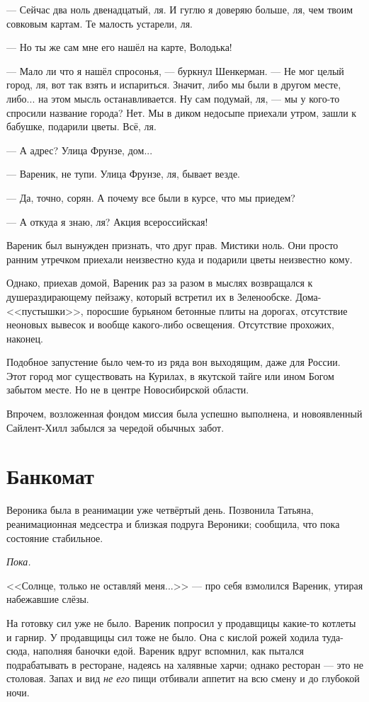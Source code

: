 \documentclass[a4paper,10pt,fleqn]{book}\usepackage{polyglossia}\setdefaultlanguage{english}\setotherlanguage{russian}\defaultfontfeatures{Ligatures=TeX,Mapping=tex-text} \usepackage{xcolor}\definecolor{lightgray}{HTML}{bbbbbb}\color{lightgray}\newcommand{\ml}[3]{\textcolor{black}{#3}}
\begin{document}
--- Сейчас два ноль двенадцатый, ля.
И гуглю я доверяю больше, ля, чем твоим совковым картам.
Те малость устарели, ля.

--- Но ты же сам мне его нашёл на карте, Володька!

--- Мало ли что я нашёл спросонья, --- буркнул Шенкерман.
--- Не мог целый город, ля, вот так взять и испариться.
Значит, либо мы были в другом месте, либо... на этом мысль останавливается.
Ну сам подумай, ля, --- мы у кого-то спросили название города?
Нет.
Мы в диком недосыпе приехали утром, зашли к бабушке, подарили цветы.
Всё, ля.

--- А адрес?
Улица Фрунзе, дом...

--- Вареник, не тупи.
Улица Фрунзе, ля, бывает везде.

--- Да, точно, сорян.
А почему все были в курсе, что мы приедем?

--- А откуда я знаю, ля?
Акция всероссийская!

Вареник был вынужден признать, что друг прав.
Мистики ноль.
Они просто ранним утречком приехали неизвестно куда и подарили цветы неизвестно кому.

Однако, приехав домой, Вареник раз за разом в мыслях возвращался к душераздирающему пейзажу, который встретил их в Зеленообске.
Дома-<<пустышки>>, поросшие бурьяном бетонные плиты на дорогах, отсутствие неоновых вывесок и вообще какого-либо освещения.
Отсутствие прохожих, наконец.

Подобное запустение было чем-то из ряда вон выходящим, даже для России.
Этот город мог существовать на Курилах, в якутской тайге или ином Богом забытом месте.
Но не в центре Новосибирской области.

Впрочем, возложенная фондом миссия была успешно выполнена, и новоявленный Сайлент-Хилл забылся за чередой обычных забот.

\section{Банкомат}

Вероника была в реанимации уже четвёртый день.
Позвонила Татьяна, реанимационная медсестра и близкая подруга Вероники;
сообщила, что пока состояние стабильное.

\emph{Пока.}

<<Солнце, только не оставляй меня...>> --- про себя взмолился Вареник, утирая набежавшие слёзы.

На готовку сил уже не было.
Вареник попросил у продавщицы какие-то котлеты и гарнир.
У продавщицы сил тоже не было.
Она с кислой рожей ходила туда-сюда, наполняя баночки едой.
Вареник вдруг вспомнил, как пытался подрабатывать в ресторане, надеясь на халявные харчи;
однако ресторан --- это не столовая.
Запах и вид \emph{не его} пищи отбивали аппетит на всю смену и до глубокой ночи.
\end{document}
